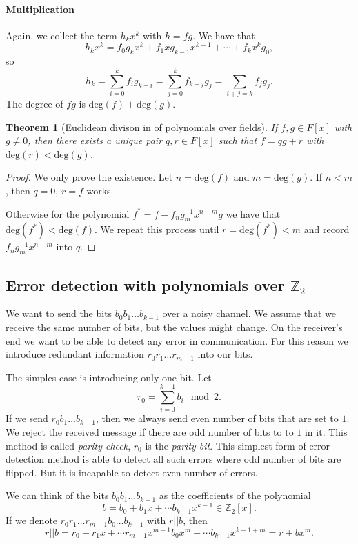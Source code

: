 \documentclass{article}
\newcommand{\Z}{\mathbb{Z}}
\newtheorem{theorem}{Theorem}
\begin{document}
\paragraph{Multiplication}
Again, we collect the term $h_k x^k$ with $h = fg$. We have that
\[
    h_k x^k = f_0 g_k x^k + f_1 x g_{k-1} x^{k-1} + \cdots + f_k x^k g_0,
\]
so
\[
    h_k = \sum_{i=0}^k f_i g_{k-i} = \sum_{j=0}^k f_{k-j} g_j = \sum_{i+j=k} f_j g_j.
\]
The degree of $fg$ is $\mathrm{deg}(f) + \mathrm{deg}(g)$.

\begin{theorem}[Euclidean divison in of polynomials over fields]
    If $f, g \in F[x]$ with $g \neq 0$, then there exists a unique pair $q,r \in F[x]$ such that $f = qg + r$ with $\mathrm{deg}(r) < \mathrm{deg}(g)$.
\end{theorem}
\begin{proof}
    We only prove the existence. Let $n = \mathrm{deg}(f)$ and $m = \mathrm{deg}(g)$. If $n < m$, then $q=0$, $r=f$ works.
    
    Otherwise for the polynomial $f^* = f - f_n g_m^{-1}x^{n-m} g$ we have that $\mathrm{deg}(f^*) < \mathrm{deg}(f)$.
    We repeat this process until $r = \mathrm{deg}(f^*) < m$ and record $f_n g_m^{-1}x^{n-m}$ into $q$.
\end{proof}

\subsection{Error detection with polynomials over $\Z_2$}

We want to send the bits $b_0 b_1 \ldots b_{k-1}$ over a noisy channel.
We assume that we receive the same number of bits, but the values might change.
On the receiver's end we want to be able to detect any error in communication.
For this reason we introduce redundant information $r_0 r_1 \ldots r_{m-1}$ into our bits.

The simples case is introducing only one bit.
Let
\[
    r_0 = \sum_{i=0}^{k-1} b_i \mod 2.
\]
If we send $r_0 b_1 \ldots b_{k-1}$, then we always send even number of bits that are set to $1$.
We reject the received message if there are odd number of bits to to $1$ in it.
This method is called \emph{parity check}, $r_0$ is the \emph{parity bit}.
This simplest form of error detection method is able to detect all such errors where odd number of bits are flipped.
But it is incapable to detect even number of errors.

We can think of the bits $b_0 b_1 \dots b_{k-1}$ as the coefficients of the polynomial
\[
    b = b_0 + b_1 x + \cdots b_{k-1} x^{k-1} \in \Z_2[x].
\]
If we denote $r_0 r_1 \ldots r_{m-1} b_0 \ldots b_{k-1}$ with $r||b$, then
\[
    r||b = r_0 + r_1 x + \cdots r_{m-1} x^{m-1} b_0 x^{m} + \cdots b_{k-1} x^{k-1 + m} = r + bx^m.
\]
\end{document}
